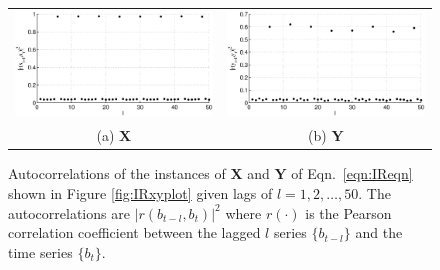 \begin{figure}[ht]
\begin{tabular}{cc}
\includegraphics[scale=0.48]{NoisyResponseExample_autocorrX.eps} & \includegraphics[scale=0.48]{NoisyResponseExample_autocorrY.eps} \\
(a) $\mathbf{X}$ & (b) $\mathbf{Y}$
\end{tabular}
\caption{Autocorrelations of the instances of $\mathbf{X}$ and $\mathbf{Y}$ of Eqn.\ \ref{eqn:IReqn} shown in Figure \ref{fig:IRxyplot} given lags of $l=1,2,\ldots,50$.  The autocorrelations are $|r(b_{t-l},b_t)|^2$ where $r(\cdot)$ is the Pearson correlation coefficient between the lagged $l$ series $\{b_{t-l}\}$ and the time series $\{b_{t}\}$.}
\label{fig:IRxyautocorr}
\end{figure}
